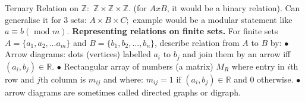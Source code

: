 \documentclass{article}
\begin{document}
\newline
Ternary Relation on $\mathbb{Z}:$ $\mathbb{Z} \times \mathbb{Z} \times \mathbb{Z}.$  (for $A x B$, it would be a binary relation).
\newline
\newline
Can generalise it for 3 sets: $A \times B \times C;$ example would be a modular statement like $a \equiv b (\text{ mod } m).$
\newline
\newline
\textbf{Representing relations on finite sets. } For finite sets $A = \{a_1, a_2, \dots a_m \}$ and $B = \{b_1, b_2, \dots , b_n\}$, describe relation from $A$ to $B$ by:
\newline
\newline
$\bullet $ Arrow diagrams: dots (vertices) labelled $a_i \text{ to } b_j$ and join them by an arrow iff $(a_i, b_j) \in \mathbb{R}.$
\newline
$\bullet $ Rectangular array of numbers (a matrix) $M_R$ where entry in $i$th row and $j$th column is $m_{ij}$ and where: $m_{ij} = 1 \text{ if } (a_i, b_j) \in \mathbb{R}$ and $0$ otherwise.
\newline
{}
\newline
\newline
$\bullet $arrow diagrams are sometimes called directed graphs or digraph.
\newpage
\end{document}
